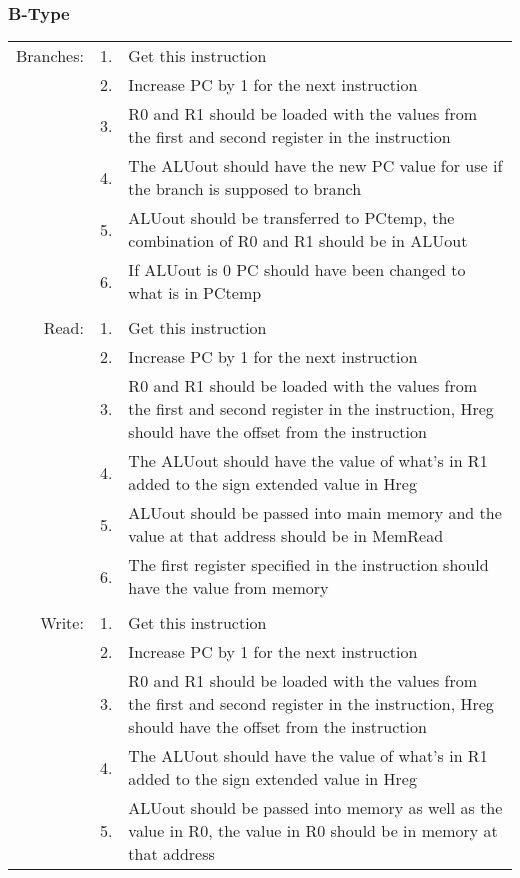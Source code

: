 		\subsubsection{B-Type}
			\begin{longtable}{ r  r  p{13cm} }
				Branches: & 1. & Get this instruction\\
				          & 2. & Increase PC by 1 for the next instruction\\
				          & 3. & R0 and R1 should be loaded with the values from the first and second register in the instruction\\
				          & 4. & The ALUout should have the new PC value for use if the branch is supposed to branch\\
				          & 5. & ALUout should be transferred to PCtemp, the combination of R0 and R1 should be in ALUout\\
				          & 6. & If ALUout is 0 PC should have been changed to what is in PCtemp\\
				          &    & \\
				Read:     & 1. & Get this instruction\\
				          & 2. & Increase PC by 1 for the next instruction\\
				          & 3. & R0 and R1 should be loaded with the values from the first and second register in the instruction, Hreg should have the offset from the instruction\\
				          & 4. & The ALUout should have the value of what's in R1 added to the sign extended value in Hreg\\
				          & 5. & ALUout should be passed into main memory and the value at that address should be in MemRead\\
				          & 6. & The first register specified in the instruction should have the value from memory\\
				          &    & \\
				Write:    & 1. & Get this instruction\\
				          & 2. & Increase PC by 1 for the next instruction\\
				          & 3. & R0 and R1 should be loaded with the values from the first and second register in the instruction, Hreg should have the offset from the instruction\\
				          & 4. & The ALUout should have the value of what's in R1 added to the sign extended value in Hreg\\
				          & 5. & ALUout should be passed into memory as well as the value in R0, the value in R0 should be in memory at that address
			\end{longtable}
